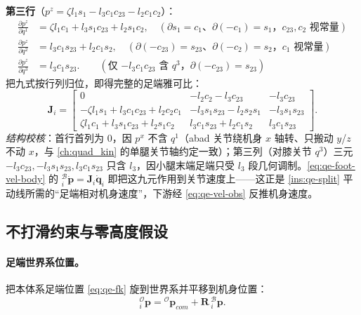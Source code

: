 \begin{example}
\textbf{第三行}（$p^z=\zeta l_1 s_1-l_3 c_1 c_{23}-l_2 c_1 c_2$）：
\begin{align*}
  \frac{\partial p^z}{\partial q^1}&=\zeta l_1 c_1+l_3 s_1 c_{23}+l_2 s_1 c_2,
   \quad(\text{$\partial s_1=c_1$、$\partial(-c_1)=s_1$，$c_{23},c_2$ 视常量})\\
  \frac{\partial p^z}{\partial q^2}&=l_3 c_1 s_{23}+l_2 c_1 s_2,
   \quad(\text{$\partial(-c_{23})=s_{23}$、$\partial(-c_2)=s_2$，$c_1$ 视常量})\\
  \frac{\partial p^z}{\partial q^3}&=l_3 c_1 s_{23}.\qquad(\text{仅 $-l_3 c_1 c_{23}$ 含 $q^3$，$\partial(-c_{23})=s_{23}$})
\end{align*}
把九式按行列归位，即得完整的足端雅可比\cite{yu2021quadruped}：
\begin{equation}
  \mathbf{J}_i=
  \begin{bmatrix}
    0 & -l_2 c_2-l_3 c_{23} & -l_3 c_{23}\\[2pt]
    -\zeta l_1 s_1+l_3 c_1 c_{23}+l_2 c_2 c_1 & -l_3 s_1 s_{23}-l_2 s_2 s_1 & -l_3 s_1 s_{23}\\[2pt]
    \zeta l_1 c_1+l_3 s_1 c_{23}+l_2 s_1 c_2 & l_3 c_1 s_{23}+l_2 c_1 s_2 & l_3 c_1 s_{23}
  \end{bmatrix}.
  \label{eq:qe-jacobian-full}
\end{equation}
\emph{结构校核}：首行首列为 $0$，因 $p^x$ 不含 $q^1$（abad 关节绕机身 $x$ 轴转、只搬动 $y$/$z$ 不动 $x$，与 \cref{ch:quad_kin} 的单腿关节轴约定一致）；第三列（对膝关节 $q^3$）三元 $-l_3 c_{23},-l_3 s_1 s_{23},l_3 c_1 s_{23}$ 只含 $l_3$，因小腿末端足端只受 $l_3$ 段几何调制。\cref{eq:qe-foot-vel-body} 的 ${}^{\mathcal{B}}_{i}\dot{\boldsymbol p}=\mathbf{J}_i\dot{\boldsymbol q}_i$ 即把这九元作用到关节速度上——这正是 \cref{ins:qe-split} 平动线所需的“足端相对机身速度”，下游经 \cref{eq:qe-vel-obs} 反推机身速度。
\end{example}

\subsection{不打滑约束与零高度假设}
\label{subsec:qe-noslip}

\paragraph{足端世界系位置。}
把本体系足端位置 \cref{eq:qe-fk} 旋到世界系并平移到机身位置\cite{yu2021quadruped}：
\begin{equation}
  {}^{\mathcal{O}}_{i}\boldsymbol p = {}^{\mathcal{O}}\boldsymbol p_{com} + \mathbf{R}\,{}^{\mathcal{B}}_{i}\boldsymbol p.
  \label{eq:qe-foot-world-pos}
\end{equation}


